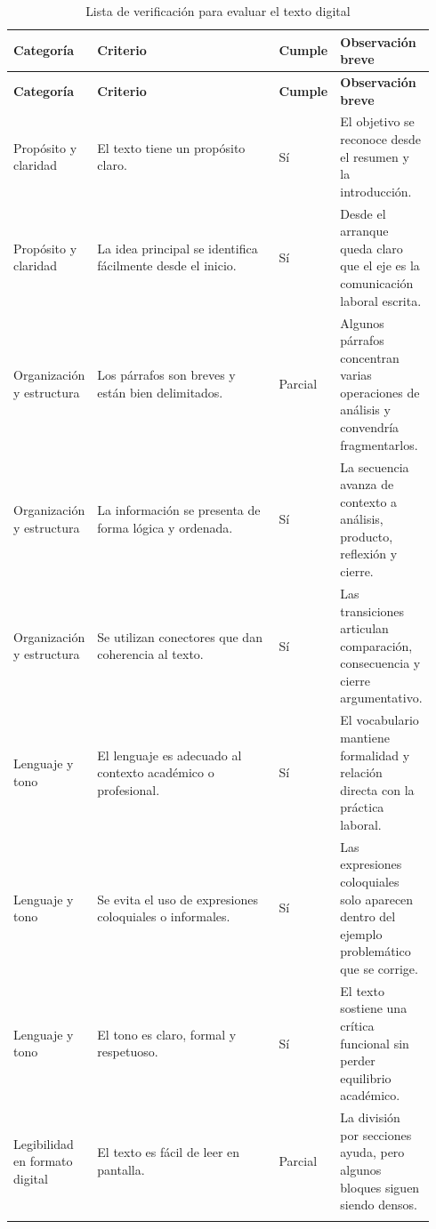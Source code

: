 \documentclass[
	spanish,
	letterpaper, oneside
]{article}
\begin{document}
\begingroup
\small
\setlength{\tabcolsep}{5pt}
\renewcommand{\arraystretch}{1.32}
\begin{longtable}{@{}L{0.18\linewidth}L{0.43\linewidth}L{0.13\linewidth}L{0.20\linewidth}@{}}
\caption{Lista de verificación para evaluar el texto digital}\label{tab:lista-verificacion}\\
\toprule
\textbf{Categoría} & \textbf{Criterio} & \textbf{Cumple} & \textbf{Observación breve} \\
\midrule
\endfirsthead
\toprule
\textbf{Categoría} & \textbf{Criterio} & \textbf{Cumple} & \textbf{Observación breve} \\
\midrule
\endhead
Propósito y claridad & El texto tiene un propósito claro. & Sí & El objetivo se reconoce desde el resumen y la introducción. \\
\addlinespace
Propósito y claridad & La idea principal se identifica fácilmente desde el inicio. & Sí & Desde el arranque queda claro que el eje es la comunicación laboral escrita. \\
\addlinespace
Organización y estructura & Los párrafos son breves y están bien delimitados. & Parcial & Algunos párrafos concentran varias operaciones de análisis y convendría fragmentarlos. \\
\addlinespace
Organización y estructura & La información se presenta de forma lógica y ordenada. & Sí & La secuencia avanza de contexto a análisis, producto, reflexión y cierre. \\
\addlinespace
Organización y estructura & Se utilizan conectores que dan coherencia al texto. & Sí & Las transiciones articulan comparación, consecuencia y cierre argumentativo. \\
\addlinespace
Lenguaje y tono & El lenguaje es adecuado al contexto académico o profesional. & Sí & El vocabulario mantiene formalidad y relación directa con la práctica laboral. \\
\addlinespace
Lenguaje y tono & Se evita el uso de expresiones coloquiales o informales. & Sí & Las expresiones coloquiales solo aparecen dentro del ejemplo problemático que se corrige. \\
\addlinespace
Lenguaje y tono & El tono es claro, formal y respetuoso. & Sí & El texto sostiene una crítica funcional sin perder equilibrio académico. \\
\addlinespace
Legibilidad en formato digital & El texto es fácil de leer en pantalla. & Parcial & La división por secciones ayuda, pero algunos bloques siguen siendo densos. \\
\addlinespace

\end{longtable}
\end{document}
